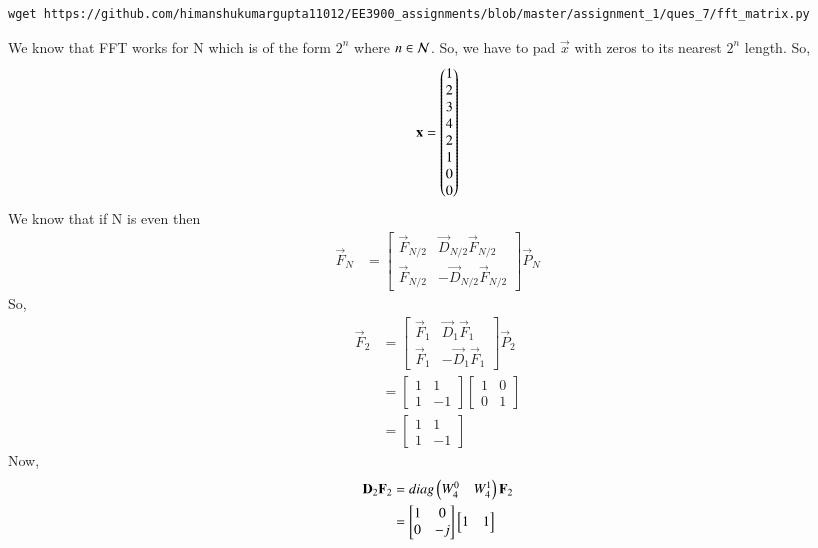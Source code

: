 \documentclass[journal,12pt,twocolumn]{IEEEtran}
\renewcommand\thesection{\arabic{section}}
\begin{document}
\begin{enumerate}[label=\arabic*.,ref=\thesection.\theenumi]
	\solution  
	\begin{lstlisting}
wget https://github.com/himanshukumargupta11012/EE3900_assignments/blob/master/assignment_1/ques_7/fft_matrix.py
	\end{lstlisting}
	We know that FFT works for N  which is of the form $2^n$ where $n\in \cal N$.
	So, we have to pad $\vec{x}$ with zeros to its nearest $2^n$ length.
	So,
	\begin{align}
		\mathbf{x}=\begin{pmatrix}1\\2\\3\\4\\2\\1\\0\\0\end{pmatrix}
	\end{align}
We know that if N is even then
\begin{align}
	\vec{F}_N&=\begin{bmatrix}
		\vec{F}_{N/2}&\vec{D}_{N/2}\vec{F}_{N/2}\\
		\vec{F}_{N/2}&-\vec{D}_{N/2}\vec{F}_{N/2}
	\end{bmatrix}\vec{P}_N
\end{align}
So,
\begin{align}
	\vec{F}_2&=\begin{bmatrix}
		\vec{F}_{1}&\vec{D}_{1}\vec{F}_{1}\\
		\vec{F}_{1}&-\vec{D}_{1}\vec{F}_{1}
	\end{bmatrix}\vec{P}_2\\
&=\begin{bmatrix}
	1& 1\\
	1&-1
\end{bmatrix}
\begin{bmatrix}
1& 0\\
0&1
\end{bmatrix}\\
&=\begin{bmatrix}
	1& 1\\
	1&-1
\end{bmatrix}
\end{align}
Now,
\begin{align}
	\mathbf{D}_{2}\mathbf{F}_{2}&=diag\begin{pmatrix}W_{4}^{0} & W_{4}^{1}\end{pmatrix}\mathbf{F}_{2}\\
	&=\begin{bmatrix}
		1& 0\\
		0&-j
	\end{bmatrix}
\begin{bmatrix}
	1& 1\\

\end{bmatrix}
\end{align}
\end{enumerate}
\end{document}
